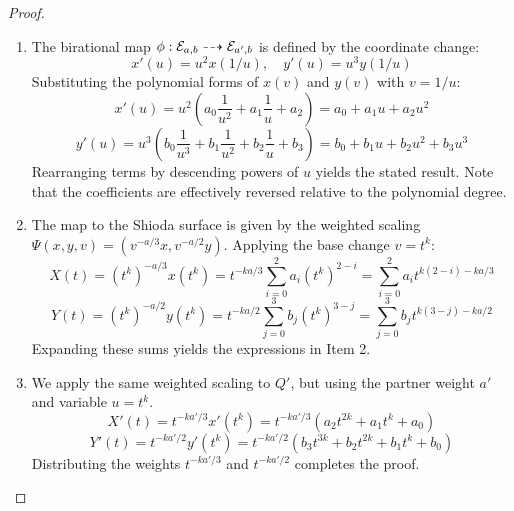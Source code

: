 \documentclass[11pt]{amsart}
\begin{document}
\begin{proof}
	\begin{enumerate}
	\item [(i)]
	The birational map $\phi: {\mathcal E}_{a,b} \dashrightarrow {\mathcal E}_{a', b}$ is defined by the coordinate change:
	\[ x'(u) = u^2 x(1/u), \quad y'(u) = u^3 y(1/u) \]
	Substituting the polynomial forms of $x(v)$ and $y(v)$ with $v=1/u$:
	\[ x'(u) = u^2 \left( a_0 \frac{1}{u^2} + a_1 \frac{1}{u} + a_2 \right) = a_0 + a_1 u + a_2 u^2 \]
	\[ y'(u) = u^3 \left( b_0 \frac{1}{u^3} + b_1 \frac{1}{u^2} + b_2 \frac{1}{u} + b_3 \right) = b_0 + b_1 u + b_2 u^2 + b_3 u^3 \]
	Rearranging terms by descending powers of $u$ yields the stated result. Note that the coefficients are effectively reversed relative to the polynomial degree.
	
	\item [(ii)]
	The map to the Shioda surface is given by the weighted scaling $\Psi(x, y, v) = (v^{-a/3}x, v^{-a/2}y)$. Applying the base change $v=t^k$:
	\[ X(t) = (t^k)^{-a/3} x(t^k) = t^{-ka/3} \sum_{i=0}^{2} a_i (t^k)^{2-i} = \sum_{i=0}^{2} a_i t^{k(2-i) - ka/3} \]
	\[ Y(t) = (t^k)^{-a/2} y(t^k) = t^{-ka/2} \sum_{j=0}^{3} b_j (t^k)^{3-j} = \sum_{j=0}^{3} b_j t^{k(3-j) - ka/2} \]
	Expanding these sums yields the expressions in Item 2.
	
		\item [(iii)]
	We apply the same weighted scaling to $Q'$, but using the partner weight $a'$ and variable $u=t^k$.
	\[ X'(t) = t^{-ka'/3} x'(t^k) = t^{-ka'/3} (a_2 t^{2k} + a_1 t^k + a_0) \]
	\[ Y'(t) = t^{-ka'/2} y'(t^k) = t^{-ka'/2} (b_3 t^{3k} + b_2 t^{2k} + b_1 t^k + b_0) \]
	Distributing the weights $t^{-ka'/3}$ and $t^{-ka'/2}$ completes the proof.
	 \end{enumerate}
\end{proof}

 



\end{document}
